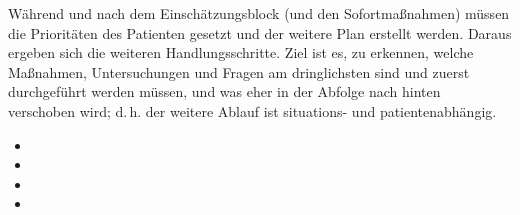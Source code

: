 \Text
{{\TxBeschreibung}}%
{%
\label{topic:pam-strategie}%
\label{topic:strategieentscheidung}%
Während und nach dem Einschätzungsblock (und den Sofortmaßnahmen) müssen
die Prioritäten des Patienten gesetzt und der weitere
Plan erstellt werden. Daraus ergeben sich die weiteren
Handlungsschritte. Ziel ist es, zu erkennen, welche
Maßnahmen, Untersuchungen und Fragen am dringlichsten sind
und zuerst durchgeführt werden müssen, und was eher in der
Abfolge nach hinten ver\-schoben wird; d.\,h. der weitere
Ablauf ist situations- und patientenabhängig.

\begin{itemize}
  \item {}
  \item {}
  \item {}
  \item {}
\end{itemize}
}%



